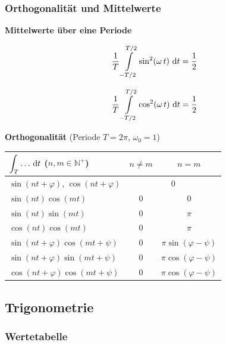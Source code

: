 \subsubsection{Orthogonalität und Mittelwerte}

\textbf{Mittelwerte über eine Periode}

\begin{minipage}{0.48\columnwidth}
    $$ \frac{1}{T} \int\limits_{-T/2}^{T/2} \sin^2(\omega \, t) \,\mathop{} \! \mathrm{d} t = \frac{1}{2} $$
\end{minipage}
\hfill
\begin{minipage}{0.48\columnwidth}
    $$ \frac{1}{T} \int\limits_{-T/2}^{T/2} \cos^2(\omega \, t) \, \mathop{} \! \mathrm{d} t = \frac{1}{2} $$
\end{minipage}

\textbf{Orthogonalität} \quad (Periode $T = 2\pi$, $\omega_0 = 1$)

\begin{center}
\renewcommand{\arraystretch}{1.5}
\begin{tabular}{@{}l c c@{}}
\toprule
$\displaystyle\int_{T}\dots\,\mathop{} \! \mathrm{d} t$ \quad ($n,m\in\mathbb{N}^+$) & $n\neq m$ & $n=m$ \\
\midrule
$\sin(nt+\varphi)$,\; $\cos(nt+\varphi)$ & \multicolumn{2}{c}{$0$} \\
$\sin(nt)\cos(mt)$ & $0$ & $0$ \\
$\sin(nt)\sin(mt)$ & $0$ & $\pi$ \\
$\cos(nt)\cos(mt)$ & $0$ & $\pi$ \\
\midrule
$\sin(nt+\varphi)\cos(mt+\psi)$ & $0$ & $\pi\sin(\varphi-\psi)$ \\
$\sin(nt+\varphi)\sin(mt+\psi)$ & $0$ & $\pi\cos(\varphi-\psi)$ \\
$\cos(nt+\varphi)\cos(mt+\psi)$ & $0$ & $\pi\cos(\varphi-\psi)$ \\
\bottomrule
\end{tabular}
\end{center}


\subsection{Trigonometrie}

\subsubsection{Wertetabelle}

